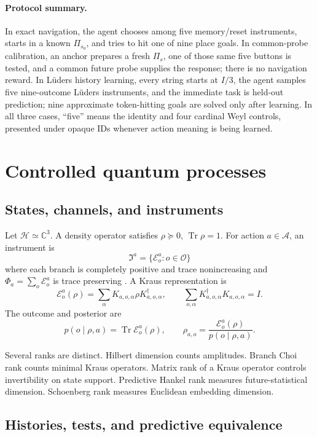 \documentclass[11pt]{article}
\theoremstyle{definition}
\theoremstyle{remark}
\newcommand{\cH}{\mathcal H}
\newcommand{\cE}{\mathcal E}
\newcommand{\cA}{\mathcal A}
\newcommand{\Tr}{\operatorname{Tr}}
\newcommand{\C}{\mathbb C}
\begin{document}
\paragraph{Protocol summary.}
In exact navigation, the agent chooses among five memory/reset instruments,
starts in a known \(\Pi_{s_0}\), and tries to hit one of nine place goals.  In
common-probe calibration, an anchor prepares a fresh \(\Pi_s\), one of those
same five buttons is tested, and a common future probe supplies the response;
there is no navigation reward.  In Lüders history learning, every string
starts at \(I/3\), the agent samples five nine-outcome Lüders instruments, and
the immediate task is held-out prediction; nine approximate token-hitting
goals are solved only after learning.  In all three cases, ``five'' means the
identity and four cardinal Weyl controls, presented under opaque IDs whenever
action meaning is being learned.

\section{Controlled quantum processes}

\subsection{States, channels, and instruments}

Let \(\cH\simeq\C^3\). A density operator satisfies
\(\rho\succeq0\), \(\Tr\rho=1\). For action \(a\in\cA\), an instrument is
\[
\mathfrak I^a=\{\cE_o^a:o\in\mathcal O\}
\]
where each branch is completely positive and trace nonincreasing and
\(\Phi_a=\sum_o\cE_o^a\) is trace preserving
\cite{Kraus1983,NielsenChuang2010}. A Kraus representation is
\[
\cE_o^a(\rho)=\sum_\alpha K_{a,o,\alpha}\rho
K_{a,o,\alpha}^\dagger,\qquad
\sum_{o,\alpha}K_{a,o,\alpha}^\dagger K_{a,o,\alpha}=I.
\]
The outcome and posterior are
\[
p(o\mid\rho,a)=\Tr\cE_o^a(\rho),\qquad
\rho_{a,o}=\frac{\cE_o^a(\rho)}{p(o\mid\rho,a)}.
\]

Several ranks are distinct. Hilbert dimension counts amplitudes. Branch Choi
rank counts minimal Kraus operators. Matrix rank of a Kraus operator controls
invertibility on state support. Predictive Hankel rank measures
future-statistical dimension. Schoenberg rank measures Euclidean embedding
dimension.

\subsection{Histories, tests, and predictive equivalence}
\end{document}
